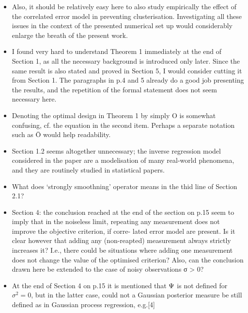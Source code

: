 \documentclass{amsart}
\begin{document}
\begin{itemize}
\item Also, it should be relatively easy here to also study empirically the effect of the correlated
error model in preventing clusterisation. Investigating all these issues in the context of the
presented numerical set up would considerably enlarge the breath of the present work.

\item I found very hard to understand Theorem 1 immediately at the end
  of Section 1, as all the necessary background is introduced only
  later. Since the same result is also stated and proved in Section 5,
  I would consider cutting it from Section 1. The paragraphs in p.4
  and 5 already do a good job presenting the results, and the
  repetition of the formal statement does not seem necessary here.

\item Denoting the optimal design in Theorem 1 by simply O is somewhat confusing, cf. the
equation in the second item. Perhaps a separate notation such as Ō would help readability.

\item Section 1.2 seems altogether unnecessary; the inverse regression model considered in the
paper are a modelisation of many real-world phenomena, and they are routinely studied in
statistical papers.

\item What does ‘strongly smoothning’ operator means in the thid line of Section 2.1?

\item Section 4: the conclusion reached at the end of the section on
  p.15 seem to imply that in the noiseless limit, repeating any
  measurement does not improve the objective criterion, if corre-
  lated error model are present. Is it clear however that adding any
  (non-reapted) measurement always strictly increases it? I.e., there
  could be situations where adding one measurement does not change the
  value of the optimised criterion? Also, can the conclusion drawn
  here be extended to the case of noisy observations σ > 0?

\item At the end of Section 4 on p.15 it is mentioned that $\Psi$ is not
  defined for $\sigma^2= 0$, but in the latter case, could not a Gaussian
  posterior measure be still defined as in Gaussian process
  regression, e.g.[4]


\end{itemize}
\end{document}
